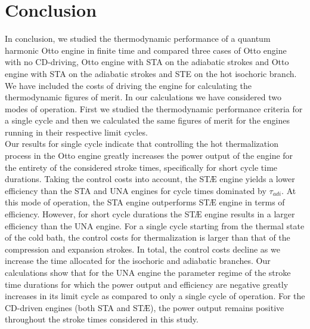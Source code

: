 \documentclass[aps,pra,twocolumn,showpacs,showkeys,groupedaddress,nobalancelastpage,nofootinbib,floatfix,superscriptaddress,longbibliography]{revtex4-2}
\begin{document}
\section{Conclusion}
\label{sec:conclusion}
In conclusion, we studied the thermodynamic performance of a quantum harmonic Otto engine in finite time and compared three cases of Otto engine with no CD-driving, Otto engine with STA on the adiabatic strokes and Otto engine with STA on the adiabatic strokes and STE on the hot isochoric branch. We have included the costs of driving the engine for calculating the thermodynamic figures of merit. In our calculations we have considered two modes of operation. First we studied the thermodynamic performance criteria for a single cycle and then we calculated the same figures of merit for the engines running
in their respective limit cycles.\\

Our results for single cycle indicate that controlling the hot thermalization process in the Otto engine greatly increases the power output of the engine for the entirety of the considered stroke times, specifically for short cycle time durations. Taking the control costs into account, the ST{\AE} engine yields a lower efficiency than the STA and UNA engines for cycle times dominated by $\tau_{adi}$. At this mode of operation, the STA engine outperforms ST{\AE} engine in terms of efficiency. However, for short cycle durations the ST{\AE} engine results in a larger efficiency than the UNA engine. For a single cycle starting from the thermal state of the cold bath, the control costs for thermalization is larger than that of the compression and expansion strokes. In total, the control costs decline as we increase the time allocated for the isochoric and adiabatic branches. Our calculations show that for the UNA engine the parameter regime of the stroke time durations for which the power output and efficiency are negative greatly increases in its limit cycle as compared to only a single cycle of operation. For the CD-driven engines (both STA and ST{\AE}), the power output remains positive throughout the stroke times considered in this study.\\
\end{document}
